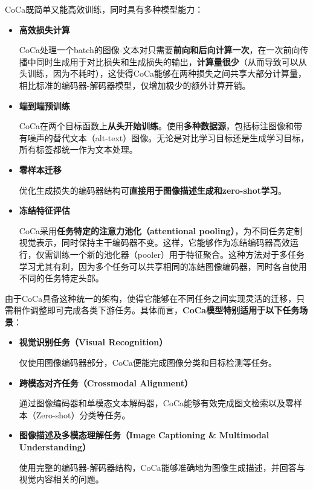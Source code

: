 \documentclass[zihao=false,fontset=windows]{ctexart}
\begin{document}
\par\vspace{1.15em}\par\vspace{0.28em}
CoCa既简单又能高效训练，同时具有多种模型能力：\par
\begin{itemize}
\item \textbf{高效损失计算}\par
CoCa处理一个batch的图像-文本对只需要\textcolor{feishuRed}{\textbf{前向和后向计算一次}}，在一次前向传播中同时生成用于对比损失和生成损失的输出，\textcolor{feishuRed}{\textbf{计算量很少}}（\textcolor{feishuBlue}{从而导致可以从头训练，因为不耗时}），\textcolor{feishuGreen}{这使得CoCa能够在两种损失之间共享大部分计算量，相比标准的编码器-解码器模型，仅增加极少的额外计算开销}。
\item \textbf{端到端预训练}\par
CoCa在两个目标函数上\textcolor{feishuRed}{\textbf{从头开始训练}}。使用\textbf{多种数据源}\textcolor{feishuGreen}{，包括标注图像和带有噪声的替代文本（alt-text）图像。无论是对比学习目标还是生成学习目标，所有标签都统一作为文本处理。}
\item \textbf{零样本迁移}\par
优化生成损失的编码器结构可\textcolor{feishuRed}{\textbf{直接用于图像描述生成和zero-shot学习}}。
\item \textbf{冻结特征评估}\par
CoCa采用\textcolor{feishuRed}{\textbf{任务特定的注意力池化（attentional pooling）}}，为不同任务定制视觉表示，同时保持主干编码器不变。\textcolor{feishuGreen}{这样，它能够作为冻结编码器高效运行，仅需训练一个新的池化器（pooler）用于特征聚合。这种方法对于多任务学习尤其有利，因为多个任务可以共享相同的冻结图像编码器，同时各自使用不同的任务特定头部。}
\end{itemize}
由于CoCa具备这种统一的架构，使得它能够在不同任务之间实现灵活的迁移，只需稍作调整即可完成各类下游任务。具体而言，\textbf{CoCa模型特别适用于以下任务场景}：\par
\begin{itemize}
\item \textbf{视觉识别任务（Visual Recognition）}\par
\textcolor{feishuGreen}{仅使用图像编码器部分，CoCa便能完成图像分类和目标检测等任务。}
\item \textbf{跨模态对齐任务（Crossmodal Alignment）}\par
\textcolor{feishuGreen}{通过图像编码器和单模态文本解码器，CoCa能够有效完成图文检索以及零样本（Zero-shot）分类等任务。}
\item \textbf{图像描述及多模态理解任务（Image Captioning \& Multimodal Understanding）}\par
\textcolor{feishuGreen}{使用完整的编码器-解码器结构，CoCa能够准确地为图像生成描述，并回答与视觉内容相关的问题。}
\end{itemize}
\end{document}

